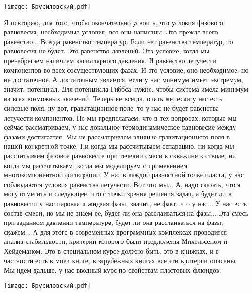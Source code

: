 \documentclass[main.tex]{subfiles}
\begin{document}
\begin{center}
\texttt{[image: Брусиловский.pdf]}
\end{center}

Я повторяю, для того, чтобы окончательно усвоить, что условия фазового равновесия, необходимые условия, вот они написаны.
Это прежде всего равенство... Всегда равенство температур.
Если нет равенства температур, то равновесия не будет.
Это равенство давлений.
Это условие, когда мы пренебрегаем наличием капиллярного давления.
И равенство летучести компонентов во всех сосуществующих фазах.
И это условие, оно необходимое, но не достаточное.
А достаточным является, если у нас минимум имеет экстремум, значит, потенциал.
Для потенциала Гиббса нужно, чтобы система имела минимум из всех возможных значений.
Теперь не всегда, опять же, если у нас есть силовые поля, ну вот, гравитационное поле, то у нас не будет равенства летучести компонентов.
Но мы предполагаем, что в тех вопросах, которые мы сейчас рассматриваем, у нас локальное термодинамическое равновесие между фазами достигается.
Мы не рассматриваем влияние гравитационного поля в нашей конкретной точке.
Ни когда мы рассчитываем сепарацию, ни когда мы рассчитываем фазовое равновесие при течении смеси к скважине в стволе, ни когда мы рассчитываем, когда мы моделируем с применением многокомпонентной фильтрации.
У нас в каждой разностной точке пласта, у нас соблюдаются условия равенства летучести.
Вот что мы...
А, надо сказать, что я могу отметить и следующее, что с точки зрения решения задач, а будет ли в равновесии у нас паровая и жидкая фазы, значит, не факт, что у нас...
У нас есть состав смеси, но мы не знаем ее, будет ли она расслаиваться на фазы...
Эта смесь при заданном давлении температуре, будет ли она расслаиваться на фазы, скажем...
А для этого в современных программных комплексах проводится анализ стабильности, критерии которого были предложены Михельсеном и Хейдеманом.
Это в специальном курсе должно быть, это в книжках, и в частности есть в моей книге, в зарубежных книгах все эти критерии описаны.
Мы идем дальше, у нас вводный курс по свойствам пластовых флюидов.

\begin{center}
\texttt{[image: Брусиловский.pdf]}
\end{center}
\end{document}
